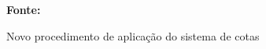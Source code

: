 \begin{figure}[ht!]
\centering

\caption{\textmd{Novo procedimento de aplicação do sistema de cotas}}
\label{fig:mec}

\par\medskip\textbf{Fonte:} \cite{sitemec} \par\medskip

\end{figure}

